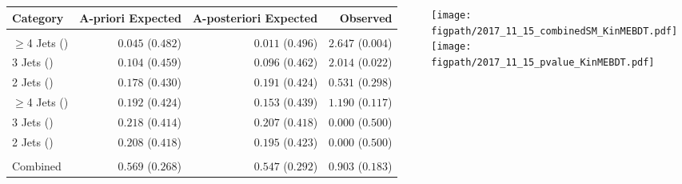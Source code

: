 \begin{frame}
\begin{columns}[T]
\begin{column}{0.6\textwidth}
\begin{table}[htbp]
				\tiny
				\vspace*{-0.15cm}
				\begin{tabular}{lrrr} \hline
					Category                            & A-priori Expected & A-posteriori Expected & Observed \\
					\hline\\[-2.45ex]
					$\geqslant$4 Jets (\Pe)             & $0.045$ ($0.482$) & $0.011$ ($0.496$) & $2.647$ ($0.004$) \\
					3 Jets (\Pe)                        & $0.104$ ($0.459$) & $0.096$ ($0.462$) & $2.014$ ($0.022$) \\
					2 Jets (\Pe)                        & $0.178$ ($0.430$) & $0.191$ ($0.424$) & $0.531$ ($0.298$) \\
					$\geqslant$4 Jets (\Pmu)            & $0.192$ ($0.424$) & $0.153$ ($0.439$) & $1.190$ ($0.117$) \\
					3 Jets (\Pmu)                       & $0.218$ ($0.414$) & $0.207$ ($0.418$) & $0.000$ ($0.500$) \\
					2 Jets (\Pmu)                       & $0.208$ ($0.418$) & $0.195$ ($0.423$) & $0.000$ ($0.500$) \\
					\hline\\[-2.45ex]
					Combined                            & $0.569$ ($0.268$) & $0.547$ ($0.292$) & $0.903$ ($0.183$) \\
					\hline
				\end{tabular}
			\end{table}
		\end{column}
		\begin{column}{0.4\textwidth}
			\centering
			\texttt{[image: \\figpath/2017\_11\_15\_combinedSM\_KinMEBDT.pdf]}\\[0.2em]
			\texttt{[image: \\figpath/2017\_11\_15\_pvalue\_KinMEBDT.pdf]}
		\end{column}
	\end{columns}
\end{frame}